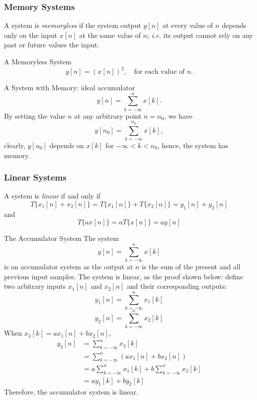 \subsubsection{Memory Systems}
A system is \textit{memoryless} if the system output $y[n]$ at every value of $n$ depends only on the input $x[n]$ at the same value of $n$; \textit{i.e.} its output cannot rely on any past or future values the input.
\begin{ex}{A Memoryless System}
    \[
        y[n] = (x[n])^2, \quad \text{for each value of $n$.}
    \]
\end{ex}

\begin{ex}{A System with Memory: ideal accumulator}
    \[
        y[n] = \sum_{k=-\infty}^n x[k].
    \]
    By setting the value $n$ at any arbitrary point $n=n_0$, we have
    \[
        y[n_0] = \sum_{k=-\infty}^{n_0} x[k],
    \]
    clearly, $y[n_0]$ depends on $x[k]$ for $-\infty < k < n_0$, hence, the system has memory.
\end{ex}
\subsubsection{Linear Systems}
A system is \textit{linear} if and only if
\[
    T\{ x_{1}[n] + x_{2}[n] \} 
    =  T\{ x_{1}[n] \} + T\{ x_{2}[n] \}
    = y_{1}[n] + y_{2}[n]
\]
and
\[
     T\{ ax[n] \} = a T\{ x[n] \} = ay[n]
\]

\begin{ex}{The Accumulator System}
The system
    \[
        y[n] = \sum_{k=-\infty}^{n}x[k]
    \]
is an accumulator system as the output at $n$ is the sum of the present and all previous input samples. The system is linear, as the proof shown below: define two arbitrary inputs $x_{1}[n]$ and $x_{2}[n]$ and their corresponding outputs:
\[
    y_{1}[n] = \sum_{k=-\infty}^{n}x_{1}[k]
\]
\[
    y_{2}[n] = \sum_{k=-\infty}^{n}x_{2}[k]
\]
When $x_{3}[k] = ax_{1}[n] + bx_{2}[n]$, 
\begin{align*}
    y_{3}[n]
    & = \sum_{k=-\infty}^{n}x_{3}[k] \\
    & = \sum_{k=-\infty}^{n} (ax_{1}[n] + bx_{2}[n]) \\
    & = a \sum_{k=-\infty}^{n} x_{1}[k] + b \sum_{k=-\infty}^{n} x_{2}[k] \\
    & = ay_{1}[k] + by_{2}[k]
\end{align*}
Therefore, the accumulator system is linear.
\end{ex}

